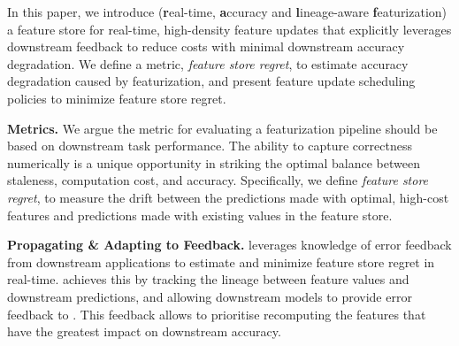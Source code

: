 

In this paper, we introduce \system{} (\textbf{r}eal-time, \textbf{a}ccuracy and \textbf{l}ineage-aware \textbf{f}eaturization)
a feature store for real-time, high-density feature updates 
that explicitly leverages downstream feedback to reduce costs with minimal downstream accuracy degradation. We define a metric, \textit{feature store regret}, to estimate accuracy degradation caused by featurization, and present feature update scheduling policies to minimize feature store regret. 

\noindent \textbf{Metrics.} We argue the metric for evaluating a featurization pipeline should be based on downstream task performance. The ability to capture correctness numerically is a unique opportunity in striking  the optimal balance between staleness, computation cost, and accuracy. Specifically, we define \textit{feature store regret}, to measure the drift between the predictions
made with optimal, high-cost features and predictions made with
existing values in the feature store.

\noindent \textbf{Propagating \& Adapting to Feedback.} \system{} leverages knowledge of error feedback from downstream applications to estimate and minimize feature store regret in real-time. \system{} achieves this by tracking the lineage between feature values and downstream predictions, and allowing downstream models to provide error feedback to \system{}. This feedback allows \system{} to prioritise recomputing the features that have the greatest impact on downstream accuracy.


